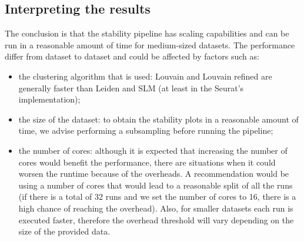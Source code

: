 \begin{figure}[H]
\end{figure}

\subsection{Interpreting the results}
The conclusion is that the stability pipeline has scaling capabilities and can be run in a reasonable amount of time for medium-sized datasets. The performance differ from dataset to dataset and could be affected by factors such as:
\begin{itemize}
    \item the clustering algorithm that is used: Louvain and Louvain refined are generally faster than Leiden and SLM (at least in the Seurat's implementation);
    \item the size of the dataset: to obtain the stability plots in a reasonable amount of time, we advise performing a subsampling before running the pipeline;
    \item the number of cores: although it is expected that increasing the number of cores would benefit the performance, there are situations when it could worsen the runtime because of the overheads. A recommendation would be using a number of cores that would lead to a reasonable split of all the runs (if there is a total of 32 runs and we set the number of cores to 16, there is a high chance of reaching the overhead). Also, for smaller datasets each run is executed faster, therefore the overhead threshold will vary depending on the size of the provided data.
\end{itemize}